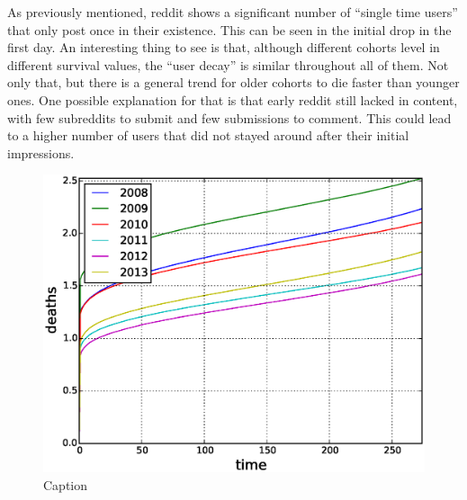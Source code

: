 As previously mentioned, reddit shows a significant number of ``single time users'' that only post once in their existence. This can be seen in the initial drop in the first day. An interesting thing to see is that, although different cohorts level in different survival values, the ``user decay'' is similar throughout all of them. Not only that, but there is a general trend for older cohorts to die faster than younger ones. One possible explanation for that is that early reddit still lacked in content, with few subreddits to submit and few submissions to comment. This could lead to a higher number of users that did not stayed around after their initial impressions. 

\begin{figure}[!tb]
\centering
\includegraphics[scale=0.4]{./images/nelson_aalen_users.eps}
\caption{Caption}
\label{fig:nelson_aalen_users}
\end{figure}
